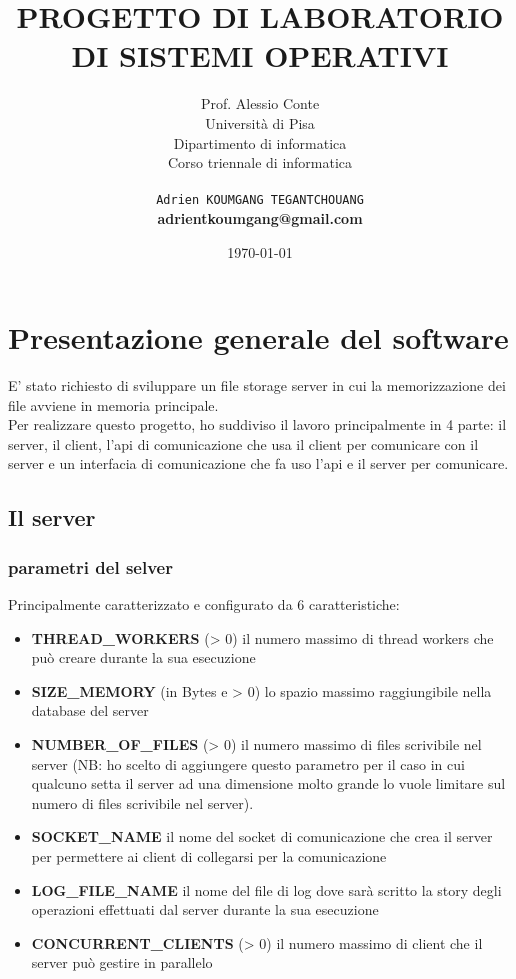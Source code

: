 \documentclass[a4paper, 10pt]{report}
\title{PROGETTO DI LABORATORIO DI SISTEMI OPERATIVI}
\author{Prof. Alessio Conte\\
		Università di Pisa\\
		Dipartimento di informatica\\
		Corso triennale di informatica\\ \\
		\texttt{Adrien KOUMGANG TEGANTCHOUANG}\\
		\textbf{adrientkoumgang@gmail.com}}
\date{\today}
\begin{document}
	
	\maketitle
	
	\tableofcontents
	
	\chapter{Presentazione generale del software}
	
	E' stato richiesto di sviluppare un file storage server in cui la memorizzazione dei file avviene in memoria principale. \\
	Per realizzare questo progetto, ho suddiviso il lavoro principalmente in 4 parte: il server, il client, l'api di comunicazione che usa il client per comunicare con il server e un interfacia di comunicazione che fa uso l'api e il server per comunicare.
	
	\section{Il server}
	
	\subsection{parametri del selver}
	
	Principalmente caratterizzato e configurato da 6 caratteristiche:
	\begin{itemize}
		\item \textbf{THREAD\_WORKERS} (> 0) il numero massimo di thread workers che può creare durante la sua esecuzione
		\item \textbf{SIZE\_MEMORY} (in Bytes e > 0) lo spazio massimo raggiungibile nella database del server
		\item \textbf{NUMBER\_OF\_FILES} (> 0) il numero massimo di files scrivibile nel server (NB: ho scelto di aggiungere questo parametro per il caso in cui qualcuno setta il server ad una dimensione molto grande lo vuole limitare sul numero di files scrivibile nel server).
		\item \textbf{SOCKET\_NAME} il nome del socket di comunicazione che crea il server per permettere ai client di collegarsi per la comunicazione
		\item \textbf{LOG\_FILE\_NAME} il nome del file di log dove sarà scritto la story degli operazioni effettuati dal server durante la sua esecuzione
		\item \textbf{CONCURRENT\_CLIENTS} (> 0) il numero massimo di client che il server può gestire in parallelo
	\end{itemize}
\end{document}
